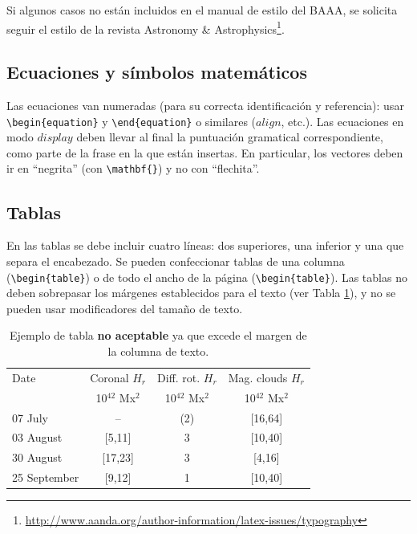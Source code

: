 \documentclass[baaa]{baaa}
\begin{document}
Si algunos casos no están incluidos en el manual de estilo del BAAA, se solicita seguir 
el estilo de la revista Astronomy \& Astrophysics\footnote{
\url{http://www.aanda.org/author-information/latex-issues/typography}}.


\subsection{Ecuaciones y símbolos matemáticos}

Las ecuaciones van numeradas (para su correcta identificación y referencia): 
usar \verb|\begin{equation}| y \verb|\end{equation}| o similares ($align$, etc.).
Las ecuaciones en modo $display$ deben llevar al final la puntuación gramatical correspondiente, 
como parte de la frase en la que están insertas.
En particular, los vectores deben
ir en ``negrita'' (con \verb+\mathbf{}+) y no con ``flechita''.


\subsection{Tablas}

En las tablas se debe incluir cuatro líneas: dos superiores, una inferior y
una que separa el encabezado.
%
Se pueden confeccionar tablas de una columna (\verb|\begin{table}|)
o de todo el ancho de la página (\verb|\begin{table}|).
%
Las tablas no deben sobrepasar los márgenes establecidos para el
texto (ver Tabla \ref{tabla1}), y no se pueden usar modificadores del tamaño de texto.


 
\begin{table}[!t]
\centering
\caption{Ejemplo de tabla {\bf no aceptable} ya que excede el margen de la columna de texto.}
\begin{tabular}{lccc}
\hline\hline\noalign{\smallskip}
Date & Coronal $H_r$ & Diff. rot. $H_r$& Mag. clouds $H_r$\\
& 10$^{42}$ Mx$^{2}$& 10$^{42}$ Mx$^{2}$ & 10$^{42}$ Mx$^{2}$ \\
\hline\noalign{\smallskip}
07 July  &  -- & (2) & [16,64]\\
03 August& [5,11]& 3 & [10,40]\\
30 August & [17,23] & 3& [4,16]\\
25 September & [9,12] & 1 & [10,40]\\
\hline
\end{tabular}
\label{tabla1}
\end{table}
 
\end{document}
